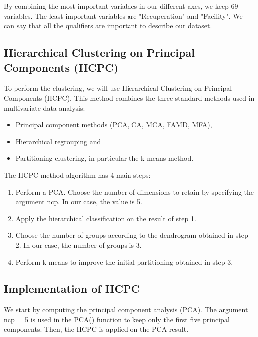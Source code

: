 \documentclass[12pt]{article}
\begin{document}
By combining the most important variables in our different axes, we keep 69 variables. The least important variables are "Recuperation" and "Facility".
We can say that all the qualifiers are important to describe our dataset.


\subsection{Hierarchical Clustering on Principal Components (HCPC) }

To perform the clustering, we will use Hierarchical Clustering on Principal Components (HCPC).
This method combines the three standard methods used in multivariate data analysis:

    
 \begin{itemize}
    \item  Principal component methods (PCA, CA, MCA, FAMD, MFA),
    \item  Hierarchical regrouping and
    \item  Partitioning clustering, in particular the k-means method.
 \end{itemize}

\vspace{0.2 cm}

The HCPC method algorithm has 4 main steps:

\begin{enumerate}
    \item  Perform a PCA. Choose the number of dimensions to retain by specifying the argument ncp. In our case, the value is 5.
    \item Apply the hierarchical classification on the result of step 1.
    \item Choose the number of groups according to the dendrogram obtained in step 2. In our case, the number of groups is 3.
    \item Perform k-means to improve the initial partitioning obtained in step 3.
\end{enumerate}


\subsection{Implementation  of HCPC}

We start by computing the principal component analysis (PCA). The argument ncp = 5 is used in the PCA() function to keep only the first five principal components. Then, the HCPC is applied on the PCA result.
\end{document}
